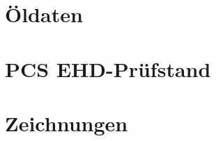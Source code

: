 \begin{appendices}
    \chapter{Öldaten}
        

    \chapter{PCS EHD-Prüfstand}
        

    \chapter{Zeichnungen}
\end{appendices}
